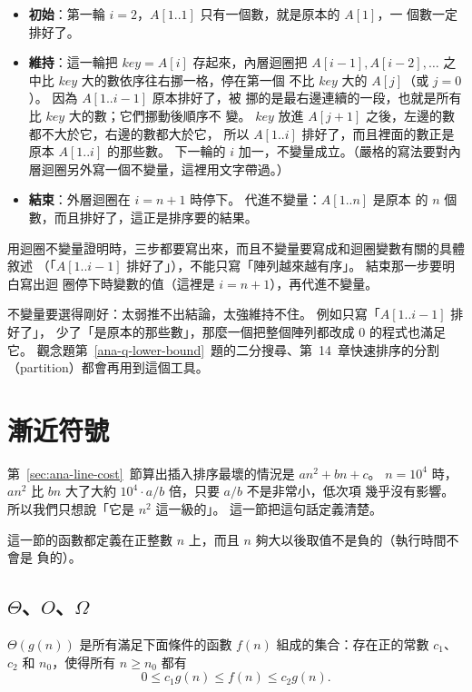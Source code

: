 \begin{itemize}
\item \textbf{初始}：第一輪 $i = 2$，$A[1..1]$ 只有一個數，就是原本的 $A[1]$，一
個數一定排好了。
\item \textbf{維持}：這一輪把 $\mathit{key} = A[i]$ 存起來，內層迴圈把
$A[i-1], A[i-2], \ldots$ 之中比 $\mathit{key}$ 大的數依序往右挪一格，停在第一個
不比 $\mathit{key}$ 大的 $A[j]$（或 $j = 0$）。 因為 $A[1..i-1]$ 原本排好了，被
挪的是最右邊連續的一段，也就是所有比 $\mathit{key}$ 大的數；它們挪動後順序不
變。 $\mathit{key}$ 放進 $A[j+1]$ 之後，左邊的數都不大於它，右邊的數都大於它，
所以 $A[1..i]$ 排好了，而且裡面的數正是原本 $A[1..i]$ 的那些數。 下一輪的 $i$
加一，不變量成立。（嚴格的寫法要對內層迴圈另外寫一個不變量，這裡用文字帶過。）
\item \textbf{結束}：外層迴圈在 $i = n + 1$ 時停下。 代進不變量：$A[1..n]$ 是原本
的 $n$ 個數，而且排好了，這正是排序要的結果。
\end{itemize}

\begin{examnote}
用迴圈不變量證明時，三步都要寫出來，而且不變量要寫成和迴圈變數有關的具體敘述
（「$A[1..i-1]$ 排好了」），不能只寫「陣列越來越有序」。 結束那一步要明白寫出迴
圈停下時變數的值（這裡是 $i = n + 1$），再代進不變量。
\end{examnote}

不變量要選得剛好：太弱推不出結論，太強維持不住。 例如只寫「$A[1..i-1]$ 排好了」，
少了「是原本的那些數」，那麼一個把整個陣列都改成 $0$ 的程式也滿足它。
觀念題第~\ref{ana-q-lower-bound}~題的二分搜尋、第~14~章快速排序的分割（partition）都會再用到這個工具。

\section{漸近符號}
\label{sec:ana-notation}

第~\ref{sec:ana-line-cost}~節算出插入排序最壞的情況是 $an^2 + bn + c$。 $n = 10^4$
時，$an^2$ 比 $bn$ 大了大約 $10^4 \cdot a/b$ 倍，只要 $a/b$ 不是非常小，低次項
幾乎沒有影響。 所以我們只想說「它是 $n^2$ 這一級的」。 這一節把這句話定義清楚。

這一節的函數都定義在正整數 $n$ 上，而且 $n$ 夠大以後取值不是負的（執行時間不會是
負的）。

\subsection{$\Theta$、$O$、$\Omega$}

\begin{definition}[$\Theta$]
\label{def:theta}
$\Theta(g(n))$ 是所有滿足下面條件的函數 $f(n)$ 組成的集合：存在正的常數 $c_1$、
$c_2$ 和 $n_0$，使得所有 $n \ge n_0$ 都有
\[
0 \le c_1 g(n) \le f(n) \le c_2 g(n).
\]
\end{definition}

